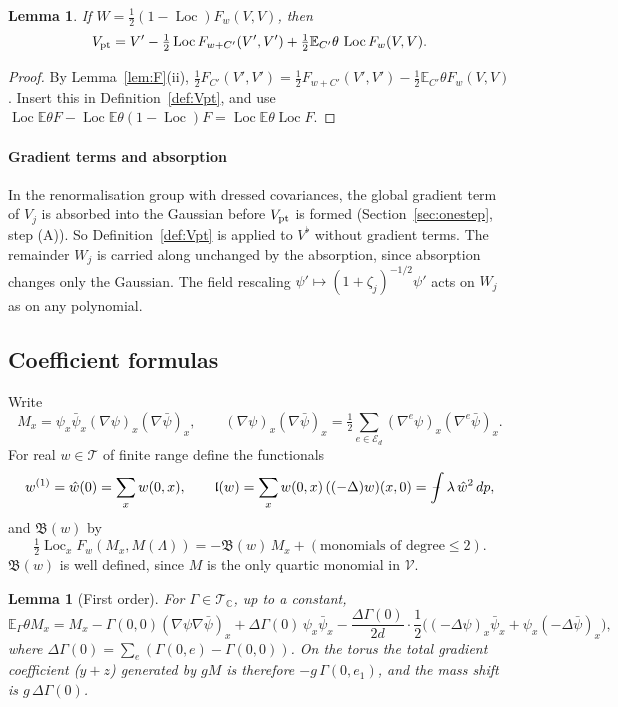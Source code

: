 \documentclass[11pt]{amsart}
\newtheorem{lemma}[theorem]{Lemma}
\theoremstyle{definition}
\theoremstyle{remark}
\numberwithin{equation}{section}
\newcommand{\C}{\mathbb{C}}
\newcommand{\E}{\mathbb{E}}
\newcommand{\cT}{\mathcal{T}}
\newcommand{\Loc}{\operatorname{Loc}}
\newcommand{\avint}{\mathop{\,\rlap{--}\!\!\int}\nolimits}
\begin{document}
\begin{lemma}\label{lem:frozen}
If $W=\frac12(1-\Loc)F_w(V,V)$, then
\[
  V_{\rm pt}=V'-\tfrac12\Loc F_{w+C'}(V',V')+\tfrac12\E_{C'}\theta\,\Loc F_w(V,V).
\]
\end{lemma}

\begin{proof}
By Lemma~\ref{lem:F}(ii),
$\frac12F_{C'}(V',V')=\frac12F_{w+C'}(V',V')-\frac12\E_{C'}\theta F_w(V,V)$. Insert this in
Definition~\ref{def:Vpt}, and use
$\Loc\E\theta F-\Loc\E\theta(1-\Loc)F=\Loc\E\theta\Loc F$.
\end{proof}

\paragraph{Gradient terms and absorption}
In the renormalisation group with dressed covariances, the global gradient term of $V_j$ is
absorbed into the Gaussian before $V_{\rm pt}$ is formed (Section~\ref{sec:onestep}, step (A)). So
Definition~\ref{def:Vpt} is applied to $V^\flat$ without gradient terms. The remainder
$W_j$ is carried along unchanged by the absorption, since absorption changes only the
Gaussian. The field rescaling $\psi'\mapsto(1+\zeta_j)^{-1/2}\psi'$ acts on $W_j$ as on
any polynomial.

\subsection{Coefficient formulas}
\label{sec:pt-coef}
Write
\[
  M_x=\psi_x\bar\psi_x(\nabla\psi)_x(\nabla\bar\psi)_x,\qquad
  (\nabla\psi)_x(\nabla\bar\psi)_x=\tfrac12\sum_{e\in\mathcal E_d}(\nabla^e\psi)_x(\nabla^e\bar\psi)_x .
\]
For real $w\in\cT$ of finite range define the functionals
\[
  w^{(1)}=\hat w(0)=\sum_xw(0,x),\qquad
  \mathfrak l(w)=\sum_xw(0,x)\,((-\Delta)w)(x,0)=\avint\lambda\,\hat w^2\,dp,
\]
and $\mathfrak B(w)$ by
\[
  \tfrac12\Loc_xF_w(M_x,M(\Lambda))=-\mathfrak B(w)\,M_x+(\text{monomials of degree}\le2).
\]
$\mathfrak B(w)$ is well defined, since $M$ is the only quartic monomial in $\mathcal V$.

\begin{lemma}[First order]\label{lem:first}
For $\Gamma\in\cT_\C$, up to a constant,
\[
  \E_\Gamma\theta M_x=M_x-\Gamma(0,0)(\nabla\psi\nabla\bar\psi)_x+\Delta\Gamma(0)\,\psi_x\bar\psi_x
  -\frac{\Delta\Gamma(0)}{2d}\cdot\frac12\bigl((-\Delta\psi)_x\bar\psi_x+\psi_x(-\Delta\bar\psi)_x\bigr),
\]
where $\Delta\Gamma(0)=\sum_e(\Gamma(0,e)-\Gamma(0,0))$. On the torus the total gradient
coefficient ($y+z$) generated by $gM$ is therefore $-g\,\Gamma(0,e_1)$, and the mass shift is
$g\,\Delta\Gamma(0)$.
\end{lemma}
\end{document}
